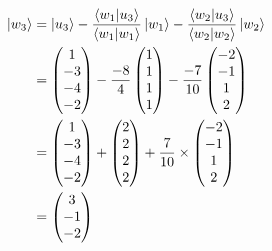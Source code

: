 \documentclass[10pt]{article}
\begin{document}
\begin{align*}
\ket{w_3} &= \ket{u_3} - \frac{ \braket{ w_1 | u_3 } }{ \braket{ w_1 | w_1 } } \ket{w_1} - \frac{ \braket{ w_2 | u_3 } }{ \braket{  w_2 | w_2  } } \ket{w_2} \\
               &= \begin{pmatrix}
               1 \\
               -3 \\
               -4 \\
               -2
               \end{pmatrix} - \frac{ -8 }{ 4 } \begin{pmatrix}
               1 \\
               1 \\
               1 \\
               1
               \end{pmatrix} - \frac{ -7 }{ 10 } \begin{pmatrix}
               -2 \\
               -1 \\
               1 \\
               2
               \end{pmatrix} \\
               &= \begin{pmatrix}
               1 \\
               -3 \\
               -4 \\
               -2
               \end{pmatrix} + \begin{pmatrix}
               2 \\
               2 \\
               2 \\
               2
               \end{pmatrix} + \frac{7}{10} \times \begin{pmatrix}
               -2 \\
               -1 \\
               1 \\
               2 
               \end{pmatrix} \\
               &= \begin{pmatrix}
               3 \\
               -1 \\
               -2 \\

\end{pmatrix}
\end{align*}
\end{document}
